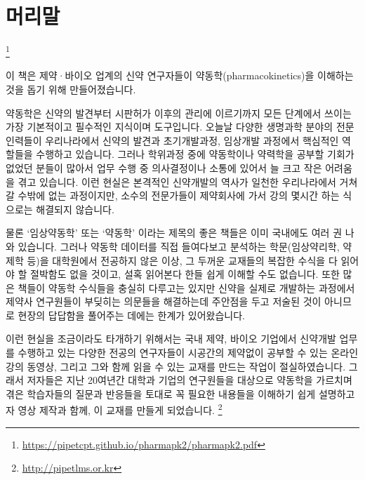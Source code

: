 \documentclass[
  11pt,
  krantz2, a4paper, twoside]{krantz}
\renewcommand{\href}[2]{#2\footnote{\url{#1}}}
\begin{document}
\setlength{\abovedisplayskip}{-5pt}
\setlength{\abovedisplayshortskip}{-5pt}

\newpage\thispagestyle{empty}\null

{
\hypersetup{linkcolor=}
\setcounter{tocdepth}{2}
\tableofcontents
}
\hypertarget{uxba38uxb9acuxb9d0}{%
\chapter*{머리말}\label{uxba38uxb9acuxb9d0}}


\href{https://pipetcpt.github.io/pharmapk2/pharmapk2.pdf}{}

\normalsize

이 책은 제약·바이오 업계의 신약 연구자들이 약동학(pharmacokinetics)을 이해하는 것을 돕기 위해 만들어졌습니다.

  
약동학은 신약의 발견부터 시판허가 이후의 관리에 이르기까지 모든 단계에서 쓰이는 가장 기본적이고 필수적인 지식이며 도구입니다.
오늘날 다양한 생명과학 분야의 전문인력들이 우리나라에서 신약의 발견과 초기개발과정, 임상개발 과정에서 핵심적인 역할들을 수행하고 있습니다.
그러나 학위과정 중에 약동학이나 약력학을 공부할 기회가 없었던 분들이 많아서 업무 수행 중 의사결정이나 소통에 있어서 늘 크고 작은 어려움을 겪고 있습니다.
이런 현실은 본격적인 신약개발의 역사가 일천한 우리나라에서 거쳐갈 수밖에 없는 과정이지만, 소수의 전문가들이 제약회사에 가서 강의 몇시간 하는 식으로는 해결되지 않습니다.

물론 `임상약동학' 또는 `약동학' 이라는 제목의 좋은 책들은 이미 국내에도
여러 권 나와 있습니다. 그러나 약동학 데이터를 직접 들여다보고 분석하는
학문(임상약리학, 약제학 등)을 대학원에서 전공하지 않은 이상, 그 두꺼운 교재들의 복잡한 수식을 다 읽어야 할 절박함도 없을 것이고, 설혹 읽어본다
한들 쉽게 이해할 수도 없습니다.
또한 많은 책들이 약동학 수식들을 충실히
다루고는 있지만 신약을 실제로 개발하는 과정에서 제약사 연구원들이 부딪히는 의문들을 해결하는데 주안점을 두고 저술된 것이 아니므로 현장의 답답함을 풀어주는 데에는 한계가 있어왔습니다.

이런 현실을 조금이라도 타개하기 위해서는 국내 제약, 바이오 기업에서 신약개발 업무를 수행하고 있는 다양한 전공의 연구자들이 시공간의 제약없이 공부할 수 있는 온라인 강의 동영상, 그리고 그와 함께 읽을 수 있는 교재를 만드는 작업이 절실하였습니다.
그래서 저자들은 지난 20여년간 대학과 기업의 연구원들을 대상으로 약동학을 가르치며 겪은 학습자들의 질문과 반응들을 토대로 꼭 필요한 내용들을 이해하기 쉽게 설명하고자 영상 제작과 함께, 이 교재를 만들게 되었습니다. \footnote{\url{http://pipetlms.or.kr}}
\end{document}
